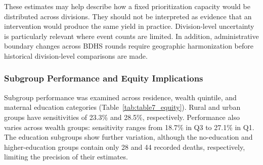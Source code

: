 \documentclass[a4paper,fleqn]{cas-sc}
\begin{document}
These estimates may help describe how a fixed prioritization capacity would be distributed across divisions. They should not be interpreted as evidence that an intervention would produce the same yield in practice. Division-level uncertainty is particularly relevant where event counts are limited. In addition, administrative boundary changes across BDHS rounds require geographic harmonization before historical division-level comparisons are made.

\subsubsection{Subgroup Performance and Equity Implications}

Subgroup performance was examined across residence, wealth quintile, and maternal education categories (Table~\ref{tab:table7_equity}). Rural and urban groups have sensitivities of 23.3\% and 28.5\%, respectively. Performance also varies across wealth groups: sensitivity ranges from 18.7\% in Q3 to 27.1\% in Q1. The education subgroups show further variation, although the no-education and higher-education groups contain only 28 and 44 recorded deaths, respectively, limiting the precision of their estimates.

\begin{table}[pos=htbp]
\centering
\caption{Subgroup performance audit on the locked BDHS 2022 test cohort.}
\label{tab:table7_equity}
\scriptsize
{}
\end{table}
\end{document}
